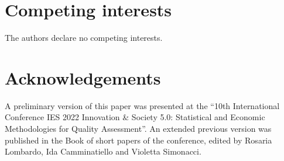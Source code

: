 \documentclass[fleqn,10pt]{wlscirep}
\begin{document}
\section*{Competing interests}
The authors declare no competing interests.

\section*{Acknowledgements}
A preliminary version of this paper was presented at the “10th International Conference IES 2022 Innovation \& Society 5.0: Statistical and Economic Methodologies for Quality Assessment”. An extended previous version was published in the Book of short papers of the conference, edited by Rosaria Lombardo, Ida Camminatiello and Violetta Simonacci.
\end{document}
